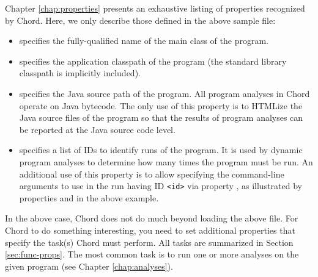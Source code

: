 Chapter \ref{chap:properties} presents an exhaustive listing of
properties recognized by Chord.  Here, we only describe those defined
in the above sample  file:

\begin{itemize}
\item
{} specifies the fully-qualified name of the main
class of the program.
\item
{} specifies the application classpath
of the program (the standard library classpath is implicitly
included).
\item
{} specifies the Java source path of the program.
All program analyses in Chord operate on Java bytecode.  The only use
of this property is to HTMLize the Java source files of the program so
that the results of program analyses can be reported at the Java
source code level.
\item
{} specifies a list of IDs to identify runs of the
program.  It is used by dynamic program analyses to determine how many
times the program must be run.  An additional use of this property is
to allow specifying the command-line arguments to use in the run
having ID {\tt <id>} via property , as
illustrated by properties  and 
in the above example.
\end{itemize}

In the above case, Chord does not do much beyond loading the above
 file.  For Chord to do something interesting,
you need to set additional properties that specify the task(s)
Chord must perform.  All tasks are summarized in Section \ref{sec:func-props}.
The most common task is to run one or more analyses on the given program
(see Chapter \ref{chap:analyses}).

